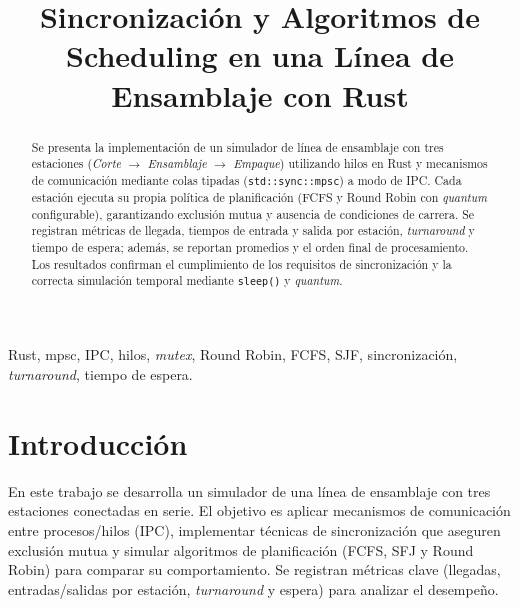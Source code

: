 \documentclass[conference]{IEEEtran}
\begin{document}
\title{Sincronización y Algoritmos de Scheduling en una Línea de Ensamblaje con Rust\\}

\author{
\and
{}
}

\maketitle

\begin{abstract}
Se presenta la implementación de un simulador de línea de ensamblaje con tres estaciones (\textit{Corte} $\rightarrow$ \textit{Ensamblaje} $\rightarrow$ \textit{Empaque}) utilizando hilos en Rust y mecanismos de comunicación mediante colas tipadas (\texttt{std::sync::mpsc}) a modo de IPC. Cada estación ejecuta su propia política de planificación (FCFS y Round Robin con \textit{quantum} configurable), garantizando exclusión mutua y ausencia de condiciones de carrera. Se registran métricas de llegada, tiempos de entrada y salida por estación, \textit{turnaround} y tiempo de espera; además, se reportan promedios y el orden final de procesamiento. Los resultados confirman el cumplimiento de los requisitos de sincronización y la correcta simulación temporal mediante \texttt{sleep()} y \textit{quantum}.
\end{abstract}

\begin{IEEEkeywords}
Rust, mpsc, IPC, hilos, \textit{mutex}, Round Robin, FCFS, SJF, sincronización, \textit{turnaround}, tiempo de espera.
\end{IEEEkeywords}

\section{Introducción}
En este trabajo se desarrolla un simulador de una línea de ensamblaje con tres estaciones conectadas en serie. El objetivo es aplicar mecanismos de comunicación entre procesos/hilos (IPC), implementar técnicas de sincronización que aseguren exclusión mutua y simular algoritmos de planificación (FCFS, SFJ y Round Robin) para comparar su comportamiento. Se registran métricas clave (llegadas, entradas/salidas por estación, \textit{turnaround} y espera) para analizar el desempeño.
\end{document}
